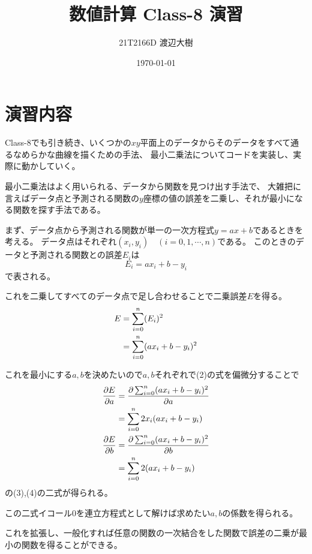 \documentclass[a4paper,11pt,dvipdfmx]{jsarticle}
\begin{document}

\title{数値計算 Class-8 演習}
\author{21T2166D 渡辺大樹}
\date{\today}
\maketitle

\section{演習内容}
Class-8でも引き続き、いくつかの$xy$平面上のデータからそのデータをすべて通るなめらかな曲線を描くための手法、
最小二乗法についてコードを実装し、実際に動かしていく。

最小二乗法はよく用いられる、データから関数を見つけ出す手法で、
大雑把に言えばデータ点と予測される関数の$y$座標の値の誤差を二乗し、それが最小になる関数を探す手法である。

まず、データ点から予測される関数が単一の一次方程式$y=ax+b$であるときを考える。
データ点はそれぞれ$(x_i,y_i)\quad (i=0,1,\cdots,n)$である。
このときのデータと予測される関数との誤差$E_i$は
\begin{equation}
    E_i = ax_i+b-y_i
\end{equation}
で表される。

これを二乗してすべてのデータ点で足し合わせることで二乗誤差$E$を得る。
\begin{align}
    E &= \sum_{i=0}^{n}(E_i)^2 \notag \\
      &= \sum_{i=0}^{n}(ax_i+b-y_i)^2
\end{align}

これを最小にする$a,b$を決めたいので$a,b$それぞれで(2)の式を偏微分することで
\begin{align}
    \frac{\partial E}{\partial a} &= \frac{\partial \sum_{i=0}^{n}(ax_i+b-y_i)^2}{\partial a} \notag \\
                                  &= \sum_{i=0}^{n}2x_i(ax_i+b-y_i) \\
    \frac{\partial E}{\partial b} &= \frac{\partial \sum_{i=0}^{n}(ax_i+b-y_i)^2}{\partial b} \notag \\
                                  &= \sum_{i=0}^{n}2(ax_i+b-y_i) 
\end{align}
の(3),(4)の二式が得られる。

この二式イコール0を連立方程式として解けば求めたい$a,b$の係数を得られる。

これを拡張し、一般化すれば任意の関数の一次結合をした関数で誤差の二乗が最小の関数を得ることができる。
\end{document}

